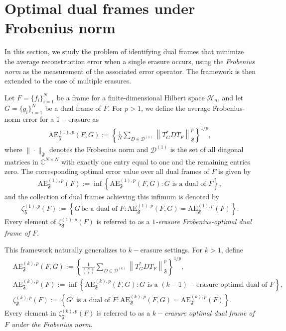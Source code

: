 \documentclass[final,1p,times]{elsarticle}
\begin{document}
\section{Optimal dual frames under Frobenius norm}

In this section, we study the problem of identifying dual frames that minimize the average reconstruction error when a single erasure occurs, using the \textit{Frobenius norm} as the measurement of the associated error operator. The framework is then extended to the case of multiple erasures.

Let $F = \{f_i\}_{i=1}^N$ be a frame for a finite-dimensional Hilbert space $\mathcal{H}_n$, and let $G = \{g_i\}_{i=1}^N$ be a dual frame of $F$. For $p > 1$, we define the average Frobenius-norm error for a  $1-$erasure as
\begin{align*}
\mathrm{AE}_{\mathfrak{F}}^{(1),p}(F, G):= \left\{ \frac{1}{N} \sum\limits_{D \in \mathcal{D}^{(1)}} \left\| T_{G}^* D T_{F} \right\|_{\mathfrak{F}}^p \right\}^{1/p},
\end{align*}
where $\| \cdot \|_{\mathfrak{F}}$ denotes the Frobenius norm and $\mathcal{D}^{(1)}$ is the set of all diagonal matrices in $\mathbb{C}^{N \times N}$ with exactly one entry equal to one and the remaining entries zero. The corresponding optimal error value over all dual frames of $F$ is given by
\begin{align*}
\mathrm{AE}_{\mathfrak{F}}^{(1),p}(F) := \inf \left\{ \mathrm{AE}_{\mathfrak{F}}^{(1),p}(F, G) : G \text{ is a dual of } F \right\},
\end{align*}
and the collection of dual frames achieving this infimum is denoted by
\begin{align*}
\zeta_{\mathfrak{F}}^{(1),p}(F) := \left\{ G\,\text{be a dual of $F$} : \mathrm{AE}_{\mathfrak{F}}^{(1),p}(F, G) = \mathrm{AE}_{\mathfrak{F}}^{(1),p}(F) \right\}.
\end{align*}
Every element of \( \zeta_{\mathfrak{F}}^{(1),p}(F) \) is referred to as a \textit{$1$-erasure Frobenius-optimal dual frame of \( F \)}.


This framework naturally generalizes to $k-$erasure settings. For $k > 1$, define
\begin{align*}
	&\mathrm{AE}_{\mathfrak{F}}^{(k),p}(F, G) := \left\{ \frac{1}{\binom{N}{k}} \sum\limits_{D \in \mathcal{D}^{(k)}} \left\| T_{G}^* D T_{F} \right\|_{\mathfrak{F}}^p \right\}^{1/p}, \\&
	\mathrm{AE}_{\mathfrak{F}}^{(k),p}(F) := \inf \left\{ \mathrm{AE}_{\mathfrak{F}}^{(k),p}(F, G) : G \text{ is a $(k-1)-$erasure optimal dual of } F \right\}, \\&
	\zeta_{\mathfrak{F}}^{(k),p}(F)  := \left\{ G' \text{ is a dual of } F : \mathrm{AE}_{\mathfrak{F}}^{(k),p}(F, G) = \mathrm{AE}_{\mathfrak{F}}^{(k),p}(F) \right\}.
\end{align*}
Every element in $\zeta_{\mathfrak{F}}^{(k),p}(F)$ is referred to as a \textit{$k-$erasure optimal dual frame of $F$ under the Frobenius norm}.
\end{document}
